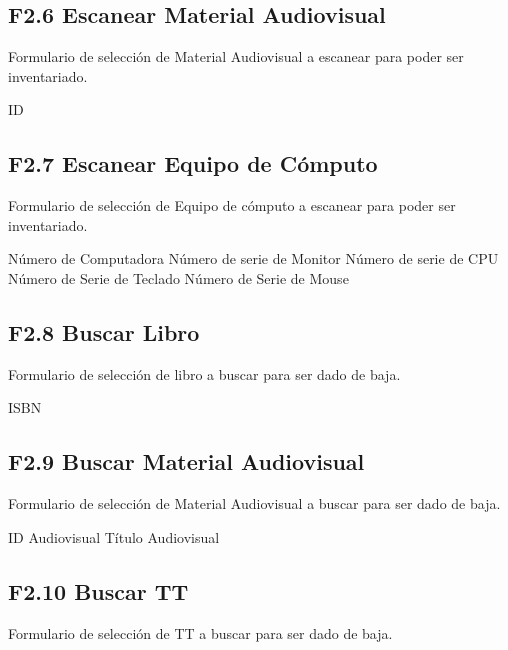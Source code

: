 \subsection{F2.6 Escanear Material Audiovisual}
Formulario de selección de Material Audiovisual a escanear para poder ser inventariado.\\

\begin{UClist}
	\UCli ID
\end{UClist}

\subsection{F2.7 Escanear Equipo de Cómputo}
Formulario de selección de Equipo de cómputo a escanear para poder ser inventariado.\\

\begin{UClist}
	\UCli Número de Computadora
	\UCli Número de serie de Monitor
	\UCli Número de serie de CPU
	\UCli Número de Serie de Teclado
	\UCli Número de Serie de Mouse
\end{UClist}

\subsection{F2.8 Buscar Libro}
Formulario de selección de libro a buscar para ser dado de baja.\\

\begin{UClist}
	\UCli ISBN
\end{UClist}

\subsection{F2.9 Buscar Material Audiovisual}
Formulario de selección de Material Audiovisual a buscar para ser dado de baja.\\

\begin{UClist}
	\UCli ID Audiovisual
	\UCli Título Audiovisual
\end{UClist}

\subsection{F2.10 Buscar TT}
Formulario de selección de TT a buscar para ser dado de baja.\\

